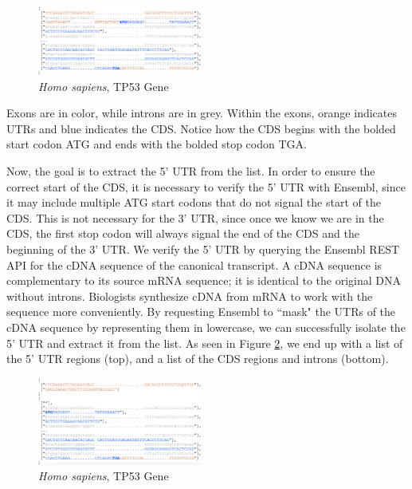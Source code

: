 \documentclass[letterpaper]{article}
\begin{document}
\begin{figure}[h!]
\centering
\vspace{-3mm}
\includegraphics[width=0.48\textwidth]{images/pre_processed_seq_homo_sapiens_tp53_ABBREV}
  \caption{\textit{Homo sapiens}, TP53 Gene}\label{fig:pre_processed_seq_homo_sapiens_tp53}
  \vspace{-3mm}
\end{figure}

Exons are in color, while introns are in grey. Within the exons, orange indicates UTRs and blue indicates the CDS. Notice how the CDS begins with the bolded start codon ATG and ends with the bolded stop codon TGA. 

Now, the goal is to extract the 5' UTR from the list. In order to ensure the correct start of the CDS, it is necessary to verify the 5' UTR with Ensembl, since it may include multiple ATG start codons that do not signal the start of the CDS. This is not necessary for the 3' UTR, since once we know we are in the CDS, the first stop codon will always signal the end of the CDS and the beginning of the 3' UTR. We verify the 5' UTR by querying the Ensembl REST API for the cDNA sequence of the canonical transcript. A cDNA sequence is complementary to its source mRNA sequence; it is identical to the original DNA without introns. Biologists synthesize cDNA from mRNA to work with the sequence more conveniently. By requesting Ensembl to ``mask" the UTRs of the cDNA sequence by representing them in lowercase, we can successfully isolate the 5' UTR and extract it from the list. As seen in Figure \ref{fig:post_processed_seq_homo_sapiens_tp53}, we end up with a list of the 5' UTR regions (top), and a list of the CDS regions and introns (bottom).%

\begin{figure}[h!]
\centering
\vspace{-3mm}
\includegraphics[width=0.48\textwidth]{images/post_processed_seq_homo_sapiens_tp53_ABBREV}
  \caption{\textit{Homo sapiens}, TP53 Gene}\label{fig:post_processed_seq_homo_sapiens_tp53}
  \vspace{-3mm}
\end{figure}
\end{document}
